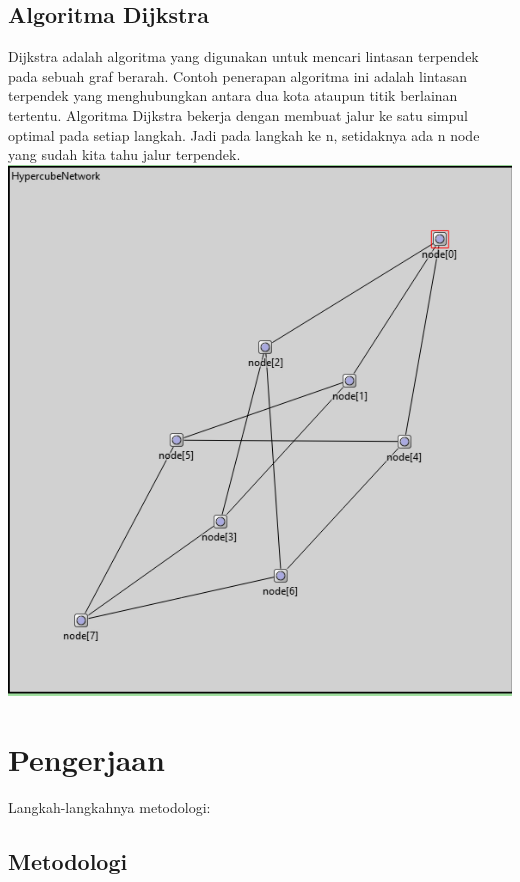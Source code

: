 \documentclass[conference]{IEEEtran}
\begin{document}
\subsection{Algoritma Dijkstra}
Dijkstra adalah algoritma yang digunakan untuk mencari lintasan terpendek pada sebuah graf berarah. Contoh penerapan algoritma ini adalah lintasan terpendek yang menghubungkan antara dua kota ataupun titik berlainan tertentu. Algoritma Dijkstra bekerja dengan membuat jalur ke satu simpul optimal pada setiap langkah. Jadi pada langkah ke n, setidaknya ada n node yang sudah kita tahu jalur terpendek.
\break
\includegraphics[scale=0.5]{images/algoritma-dijkstra.png}

\section{Pengerjaan}\label{pengerjaan}
Langkah-langkahnya metodologi:

\subsection{Metodologi}
\end{document}
